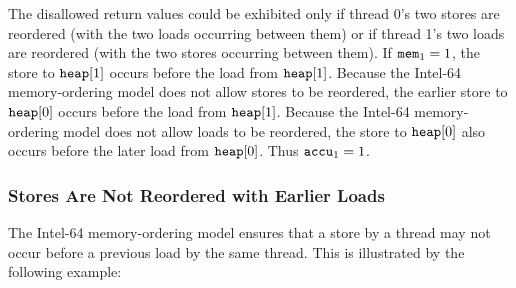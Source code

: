 \begin{table}[!hbt]
\noindent{}
\caption{Stores Are Not Reordered with Other Stores \cite[Example 8-1]{ref:Intel}}
\label{tbl:litmus:intel:1}
\end{table}

\noindent
The disallowed return values could be exhibited only if thread 0’s two stores are reordered (with the two loads occurring between them) or if thread 1’s two loads are reordered (with the two stores occurring between them).
\bigbreak
\noindent
If $\texttt{mem}_1 = 1$, the store to $\texttt{heap}[1]$ occurs before the load from $\texttt{heap}[1]$.
Because the Intel-64 memory-ordering model does not allow stores to be reordered, the earlier store to $\texttt{heap}[0]$ occurs before the load from $\texttt{heap}[1]$.
Because the Intel-64 memory-ordering model does not allow loads to be reordered, the store to $\texttt{heap}[0]$ also occurs before the later load from $\texttt{heap}[0]$.
Thus $\texttt{accu}_1 = 1$.

\newpage

\subsubsection*{Stores Are Not Reordered with Earlier Loads}

The Intel-64 memory-ordering model ensures that a store by a thread may not occur before a previous load by the same thread.
This is illustrated by the following example:

